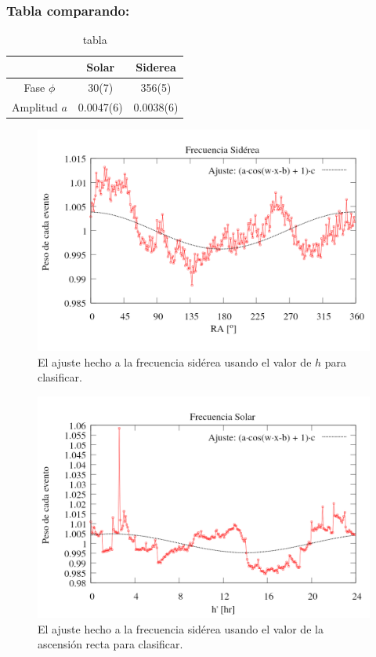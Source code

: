 	\subsubsection{Tabla comparando:}
		
		\begin{table}[H]
		\centering
		
		\begin{tabular}{c|c|c}
					& Solar 		& Siderea\\ \hline
		Fase $\phi$ & 30(7) 	    & 356(5) 			\\
		Amplitud $a$& 0.0047(6)	    &0.0038(6)			\\
		\end{tabular}
		\caption{tabla}
		\end{table}
		
		
		
		\begin{figure}[H]
			\centering
			\includegraphics[width=\linewidth]{eventos_RA_ajuste_cos.png}
			\caption{El ajuste hecho a la frecuencia sidérea usando el valor de $h$ para clasificar.}
		\end{figure}
		
		
		
		\begin{figure}[H]
			\centering
			\includegraphics[width=\linewidth]{eventos_hora_local_ajuste_cos.png}
			\caption{El ajuste hecho a la frecuencia sidérea usando el valor de la ascensión recta para clasificar.}
		\end{figure}
		
